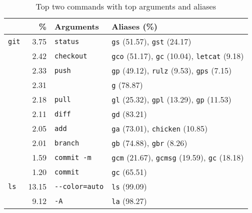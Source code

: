 \newcommand{\numx}[1]{{\small (\num{#1})}}
\begin{table}
    \caption{Top two commands with top arguments and aliases}
    \label{tab:command-summary}
    \begin{tabular}{@{}lrll@{}}
        \toprule
              &          \% &                 Arguments & Aliases (\%) \\
        \midrule
          \verb|git| &   \num{3.75} &             \verb|status| &                                  \verb|gs| \numx{51.57}, \verb|gst| \numx{24.17} \\
                     &   \num{2.42} &           \verb|checkout| & \verb|gco| \numx{51.17}, \verb|gc| \numx{10.04}, \verb|letcat| \numx{9.18} \\
                     &   \num{2.33} &               \verb|push| &    \verb|gp| \numx{49.12}, \verb|rulz| \numx{9.53}, \verb|gps| \numx{7.15} \\
                     &   \num{2.31} &                   \verb|| &                                                                  \verb|g| \numx{78.87} \\
                     &   \num{2.18} &               \verb|pull| &    \verb|gl| \numx{25.32}, \verb|gpl| \numx{13.29}, \verb|gp| \numx{11.53} \\
                     &   \num{2.11} &               \verb|diff| &                                                                 \verb|gd| \numx{83.21} \\
                     &   \num{2.05} &                \verb|add| &                              \verb|ga| \numx{73.01}, \verb|chicken| \numx{10.85} \\
                     &   \num{2.01} &             \verb|branch| &                                   \verb|gb| \numx{74.88}, \verb|gbr| \numx{8.26} \\
                     &   \num{1.59} &          \verb|commit -m| & \verb|gcm| \numx{21.67}, \verb|gcmsg| \numx{19.59}, \verb|gc| \numx{18.18} \\
                     &   \num{1.20} &             \verb|commit| &                                                                 \verb|gc| \numx{65.51} \\
        \midrule
           \verb|ls| &  \num{13.15} &       \verb|--color=auto| &                                                                 \verb|ls| \numx{99.09} \\
                     &   \num{9.12} &                 \verb|-A| &                                                                 \verb|la| \numx{98.27} \\

\end{tabular}
\end{table}
